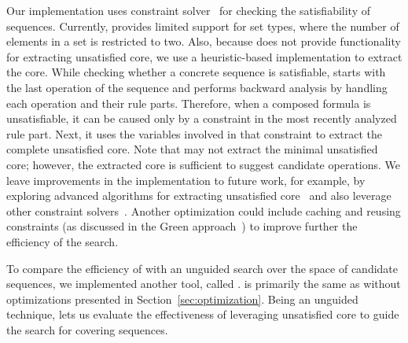Our implementation \tool{}  uses \choco{} constraint
solver~\cite{Choco} for checking the satisfiability of sequences.  Currently,
\tool{} provides limited support for set types, where the number of elements in
a set is restricted to two. Also, because \choco{} does not provide
functionality for extracting unsatisfied core, we use a heuristic-based
implementation to extract the core. While checking whether a concrete sequence
is satisfiable, \tool{} starts with the last operation of the sequence and
performs backward analysis by handling each operation and their rule
parts. Therefore, when a composed formula is unsatisfiable, it can be caused
only by a constraint in the most recently analyzed rule part. Next,
it uses the variables involved in that constraint to extract the complete
unsatisfied core. Note that \tool{} may not extract the minimal unsatisfied
core; however, the extracted core is sufficient to suggest candidate
operations. We leave improvements in the implementation to future work, for
example, by exploring advanced algorithms for extracting unsatisfied
core~\cite{Liffiton:2008:ACM} and also leverage other constraint
solvers~\cite{DeMoura:2008}. Another optimization could include caching and
reusing constraints (\eg as discussed in the Green approach~\cite{VisserGD12})
to improve further the efficiency of the search.

To compare the efficiency of \tool{} with an unguided search
over the space of candidate sequences, we implemented another tool, called
\exhaust{}. \exhaust{} is primarily the same as \tool{} without optimizations
presented in Section~\ref{sec:optimization}. Being an unguided technique, \exhaust{} lets us evaluate the
effectiveness of leveraging unsatisfied core to guide the search for covering
sequences.



